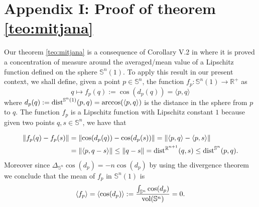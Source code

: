 \documentclass{amsart}
\theoremstyle{definition}
\theoremstyle{remark}
\newcommand{\erre}{\mathbb{R}}
\newcommand{\ese}{\mathbb{S}}
\begin{document}
\section*{Appendix I: Proof of theorem \ref{teo:mitjana}}\label{appendix}

Our theorem \ref{teo:mitjana}  is a consequence of Corollary V.2 in \cite{MS} where it is proved a concentration of measure around the averaged/mean value of a Lipschitz function defined on the sphere $\ese^n(1)$. To apply this result in our present context, we shall define, given a point $p\in \mathbb{S}^n$, the function $f_p: \ese^n(1) \rightarrow \erre^+$ as
$$
q\mapsto f_p(q):=\cos(d_p(q))=\langle p, q\rangle 
$$
\noindent where $d_p(q):={\rm dist}^{\ese^n(1)}(p,q)={\rm arccos}(\langle p, q\rangle)$ is the distance in the sphere from $p$ to $q$.
The function $f_p$ is a Lipschitz function with Lipschitz constant $1$ because given two points  $q,s\in \mathbb{S}^n$, we have that 

$$
\begin{aligned}
    \left\Vert f_p(q)-f_p(s)\right\Vert&=\left\Vert \cos(d_p(q))-\cos(d_p(s))\right\Vert=\Vert \langle p, q\rangle-\langle p, s\rangle \Vert \\&=\Vert \langle p, q- s\rangle \Vert
\leq \Vert q-s\Vert={\rm dist}^{\mathbb{R}^{n+1}}(q,s)
\leq  {\rm dist}^{\mathbb{S}^n}(p,q).
\end{aligned}
$$
Moreover since $\Delta_{\mathbb{S}^{n}}\cos(d_p)=-n\cos(d_p)$ by using the divergence theorem we conclude that the mean of $f_p$ in $\ese^n(1)$ is 
$$
\langle f_p \rangle=\langle \cos(d_p)\rangle:=\frac{\int_{\mathbb{S}^n}\cos(d_p)}{{\rm vol}(\mathbb{S}^n)}=0.
$$
\end{document}
